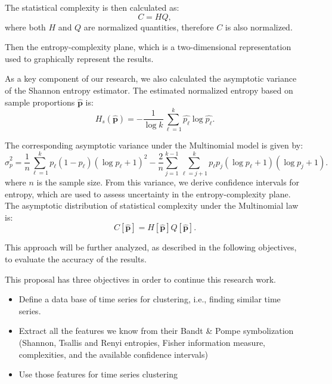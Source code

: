 The statistical complexity is then calculated as:
\begin{equation}
	C=HQ,
\end{equation}
where both $H$ and $Q$ are normalized quantities, therefore $C$ is also normalized.   

Then the entropy-complexity plane, which is a two-dimensional representation used to graphically represent the results. 

As a key component of our research, we also calculated the asymptotic variance of the Shannon entropy estimator. The estimated normalized entropy based on sample proportions $\widehat{\bm{p}}$ is: 
\begin{equation}
	H_s(\widehat{\bm{p}})=-\dfrac{1}{\log k}\sum_{\ell=1}^{k}\widehat{p_\ell}\log\widehat{p_\ell}.
\end{equation}

The corresponding asymptotic variance under the Multinomial model is given by:
\begin{equation}
	\widehat{\sigma}^2_p=\dfrac{1}{n}\sum_{\ell=1}^{k}p_\ell(1-p_\ell)(\log p_\ell+1)^2-\dfrac{2}{n}\sum_{j=1}^{k-1}\sum_{\ell=j+1}^{k}p_\ell p_j(\log p_\ell+1)(\log p_j+1).
\end{equation}
where $n$ is the sample size. From this variance, we derive confidence intervals for entropy, which are used to assess uncertainty in the entropy-complexity plane. The asymptotic distribution of statistical complexity under the Multinomial law is:
\begin{equation}
		C[\widehat{\bm{p}}]=H[\widehat{\bm{p}}]Q[\widehat{\bm{p}}].
\end{equation}

This approach will be further analyzed, as described in the following objectives, to evaluate the accuracy of the results.

This proposal has three objectives in order to continue this research work.
\begin{itemize}
	\item Define a data base of time series for clustering, i.e., finding similar time series. 
	\item Extract all the features we know from their Bandt \& Pompe symbolization (Shannon, Tsallis and Renyi entropies, Fisher information measure, complexities, and the available confidence intervals)
	\item Use those features for time series clustering 
\end{itemize} 

